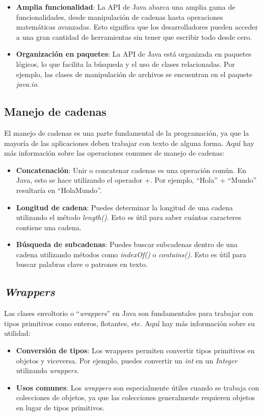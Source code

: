 \documentclass[11pt, twocolumn]{article}
\begin{document}
  \begin{itemize}
    \item \textbf{Amplia funcionalidad}: La API de Java abarca una amplia gama de funcionalidades, desde manipulación de cadenas hasta operaciones matemáticas avanzadas. Esto significa que los desarrolladores pueden acceder a una gran cantidad de herramientas sin tener que escribir todo desde cero.
    \item \textbf{Organización en paquetes}: La API de Java está organizada en paquetes lógicos, lo que facilita la búsqueda y el uso de clases relacionadas. Por ejemplo, las clases de manipulación de archivos se encuentran en el paquete \textit{java.io}.
  \end{itemize}

  \subsection*{Manejo de cadenas}
  El manejo de cadenas es una parte fundamental de la programación, ya que la mayoría de las aplicaciones deben trabajar con texto de alguna forma. Aquí hay más información sobre las operaciones comunes de manejo de cadenas:

  \begin{itemize}
    \item \textbf{Concatenación}: Unir o concatenar cadenas es una operación común. En Java, esto se hace utilizando el operador +. Por ejemplo, ``Hola'' + ``Mundo'' resultaría en ``HolaMundo''.
    \item \textbf{Longitud de cadena}: Puedes determinar la longitud de una cadena utilizando el método \textit{length()}. Esto es útil para saber cuántos caracteres contiene una cadena.
    \item \textbf{Búsqueda de subcadenas}: Puedes buscar subcadenas dentro de una cadena utilizando métodos como \textit{indexOf()} o \textit{contains()}. Esto es útil para buscar palabras clave o patrones en texto.
  \end{itemize}

  \subsection*{\textit{Wrappers}}
  Las clases envoltorio o ``\textit{wrappers}'' en Java son fundamentales para trabajar con tipos primitivos como enteros, flotantes, etc. Aquí hay más información sobre su utilidad:

  \begin{itemize}
    \item \textbf{Conversión de tipos}: Los wrappers permiten convertir tipos primitivos en objetos y viceversa. Por ejemplo, puedes convertir un \textit{int} en un \textit{Integer} utilizando \textit{wrappers}.
    \item \textbf{Usos comunes}: Los \textit{wrappers} son especialmente útiles cuando se trabaja con colecciones de objetos, ya que las colecciones generalmente requieren objetos en lugar de tipos primitivos.
  \end{itemize}
\end{document}
